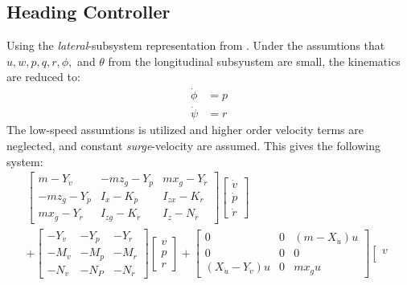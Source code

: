 	\subsection{Heading Controller}
		Using the \textit{lateral}-subsystem representation from \cite{fossen}. Under the assumtions
		that $u, w, p, q, r, \phi,$ and $\theta$ from the longitudinal subsyustem are small, the
		kinematics are reduced to:
		\begin{align}
			\dot{\phi} &= p \\
			\dot{\psi} &= r 
		\end{align}
		The low-speed assumtions is utilized and higher order velocity terms are neglected, and
		constant \textit{surge}-velocity are assumed. This gives the following system:
		\begin{equation}
			\begin{aligned}
				\left [ \begin{array}{ccc}
					m - Y_{\dot{v}} & - m z_g - Y_{\dot{p}} & m x_g - Y_{\dot{r}} \\
					-m z_g - Y_{\dot{p}} & I_x - K_{\dot{p}} & I_{zx} - K_{\dot{r}} \\
					m x_g - Y_{\dot{r}} & I_{zg} - K_{\dot{r}} & I_z - N_{\dot{r}} 
					\end{array} \right]
				\left [ \begin{array}{c}
					\dot{v} \\
					\dot{p} \\
					\dot{r} 
					\end{array} \right] \\
				+ \left [ \begin{array}{ccc}
					-Y_v	&	-Y_p 	&	-Y_r \\
					-M_v	&	-M_p	&	-M_r \\
					-N_v	&	-N_P	&	-N_r
					\end{array} \right]
				\left [ \begin{array}{c}
					v \\
					p \\
					r 
				\end{array} \right] + 
				\left [ \begin{array}{ccc} 
					0 & 0 & (m - X_{\dot{u}})u \\
					0 & 0 &  0 \\
					(X_{\dot{u}} - Y_{\dot{v}}) u & 0 & m x_g u 
					\end{array} \right]	
				\left [ \begin{array}{c}
					v \\

\end{array}
\end{aligned}
\end{equation}
